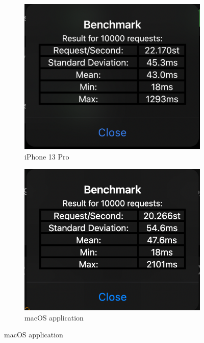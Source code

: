 \begin{figure}[H]
    \centering
    \begin{subfigure}{0.48\textwidth}
        \centering
        \includegraphics[width=1\textwidth]{img/Run3Dev1.png}
        \caption{iPhone 13 Pro}
        \label{fig:bench3:dev1}
    \end{subfigure}
    \hspace{5px}
    \begin{subfigure}{0.48\textwidth}
        \centering
        \includegraphics[width=1\textwidth]{img/Run3Dev2.png}
        \caption{macOS application}

\end{subfigure}
\end{figure}
